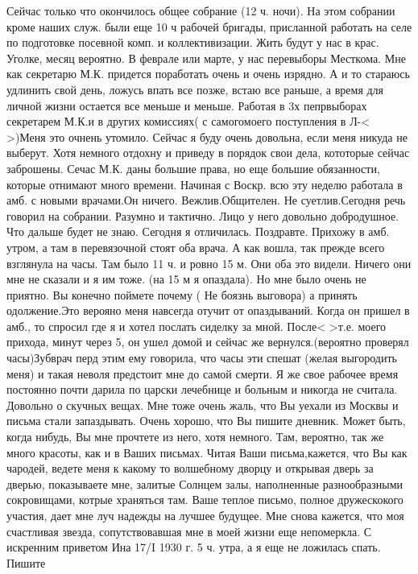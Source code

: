 Сейчас только что окончилось общее собрание (12 ч. ночи). На этом собрании кроме наших служ. были еще 10 ч рабочей бригады, присланной работать на селе по подготовке посевной комп. и коллективизации. Жить будут у нас в крас. Уголке, месяц вероятно. В феврале или марте, у нас перевыборы Месткома. Мне как секретарю М.К. придется поработать очень и очень изрядно. А и то стараюсь удлинить свой день, ложусь впать все позже, встаю все раньше, а время для личной жизни остается все меньше и меньше. Работая в 3х пепрвыборах секретарем М.К.и в других комиссиях( с самогомоего поступления в Л-< >)Меня это очнень утомило. Сейчас я буду очень довольна, если меня никуда не выберут. Хотя немного отдохну и приведу в порядок свои дела, кототорые сейчас заброшены. Сечас М.К. даны большие права, но еще большие обязанности, которые отнимают много времени. Начиная с Воскр. всю эту неделю работала в амб. с новыми врачами.Он ничего. Вежлив.Общителен. Не суетлив.Сегодня речь говорил на собрании. Разумно и тактично. Лицо у него довольно добродушное. Что дальше будет не знаю. Сегодня я отличилась. Поздравте.
Прихожу в амб. утром, а там в перевязочной стоят оба врача. А как вошла, так прежде всего взглянула на часы. Там было 11 ч. и ровно 15 м. Они оба это видели. Ничего они мне не сказали и я им тоже. (на 15 м я опаздала). Но мне было очень не приятно. Вы конечно поймете почему ( Не боязнь выговора) а принять одолжение.Это верояно меня навсегда отучит от опаздываний. Когда он пришел в амб., то спросил где я и хотел послать сиделку за мной. После< >т.е. моего прихода, минут через 5, он ушел домой и сейчас же вернулся.(вероятно проверял часы)Зубврач перд этим ему говорила, что часы эти спешат (желая выгородить меня) и такая неволя предстоит мне до самой смерти. Я же свое рабочее время постоянно почти дарила по царски лечебнице и больным и никогда не считала.
Довольно о скучных вещах.
Мне тоже очень жаль, что Вы уехали из Москвы и письма стали запаздывать. Очень хорошо, что Вы пишите дневник. Может быть, когда нибудь, Вы мне прочтете из него, хотя немного. Там, вероятно, так же много красоты, как и в Ваших письмах.
Читая Ваши письма,кажется, что Вы как чародей, ведете меня к какому то волшебному дворцу и открывая дверь за дверью, показываете мне, залитые Солнцем залы, наполненные разнообразными сокровищами, котрые храняться там.
Ваше теплое письмо, полное дружескокого участия, дает мне луч надежды на лучшее будущее. Мне снова кажется, что моя счастливая звезда, сопутствовавшая мне в моей жизни еще непомеркла.
С искренним приветом Ина
17/I 1930 г.
5 ч. утра, а я еще не ложилась спать.
Пишите


